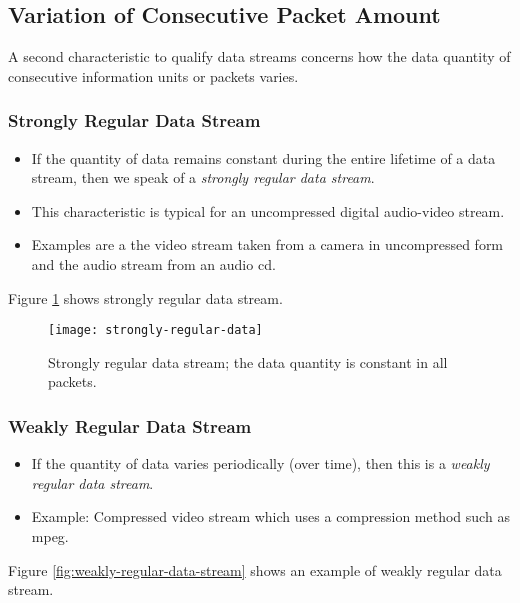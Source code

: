 \subsection{Variation of Consecutive Packet Amount}
A second characteristic to qualify data streams concerns how the data quantity of
consecutive information units or packets varies.

\subsubsection{Strongly Regular Data Stream}
\begin{itemize}
	\item If the quantity of data remains constant during the entire lifetime of a data stream, then we speak of a \textit{strongly regular data stream}.
	\item This characteristic is typical for an uncompressed digital audio-video
	stream.
	\item Examples are a the video stream taken from a camera in uncompressed form and the audio stream from an audio \gls{cd}.
\end{itemize}
 Figure {\ref{fig:strongly-regular-data-stream}} shows strongly regular data stream.  
	
	\begin{figure}[hb]
		\centering
		\texttt{[image: strongly-regular-data]}
		\caption[Strongly regular data stream]{Strongly regular data stream; the data quantity is constant in all packets.}
		\label{fig:strongly-regular-data-stream}
	\end{figure}

\subsubsection{Weakly Regular Data Stream}
\begin{itemize}
	\item If the quantity of data varies periodically (over time), then this is a \textit{weakly regular data stream}. 
	\item Example: Compressed video stream which uses a compression method such as \gls{mpeg}.
\end{itemize}


Figure {\ref{fig:weakly-regular-data-stream}} shows an example of weakly regular data stream.
	
